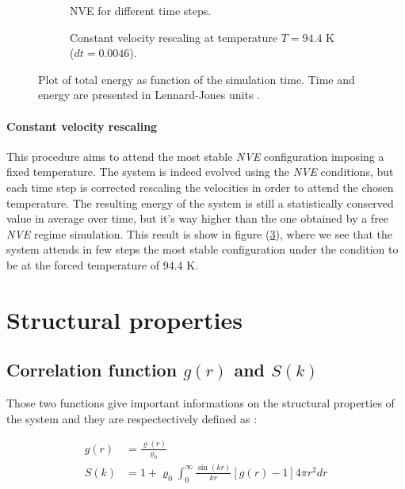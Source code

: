 \documentclass[12pt,english]{smfart}
\begin{document}
\begin{figure}
    \begin{subfigure}{0.5\textwidth}
        \resizebox{\textwidth}{!}{
            
        }
        \caption{NVE for different time steps.}
        \label{task1_total_energy}
    \end{subfigure}
    \begin{subfigure}{0.5\textwidth}
        \resizebox{\textwidth}{!}{
            
        }
        \caption{Constant velocity rescaling at temperature $T = 94.4$ \si{K} ($dt =0.0046$).}
        \label{task1_fixT}
    \end{subfigure}
    \caption{Plot of total energy as function of the simulation time. Time and energy are presented in Lennard-Jones units \cite{ljunits}.}
\end{figure}

\paragraph{Constant velocity rescaling}
This procedure aims to attend the most stable \textit{NVE} configuration imposing a fixed temperature. The system is indeed evolved using the \textit{NVE} conditions, but each time step is corrected rescaling the velocities in order to attend the chosen temperature. The resulting energy of the system is still a statistically conserved value in average over time, but it's way higher than the one obtained by a free \textit{NVE} regime simulation. This result is show in figure (\ref{task1_fixT}), where we see that the system attends in few steps the most stable configuration under the condition to be at the forced temperature of $94.4$ \si{K}.

\section{Structural properties} \label{sec:structural}

\subsection{Correlation function $g(r)$ and $S(k)$} 

Those two functions give important informations on the structural properties of the system and they are respectectively defined as \cite{rahman}:

\begin{align}\label{correlation}
g(r) &= \frac{\varrho(r)}{\varrho_0} \\
S(k) &= 1 + \varrho_0 \int_0^\infty \frac{\sin(kr)}{kr} [g(r) - 1] 4\pi r^2 dr
\end{align}
\end{document}

